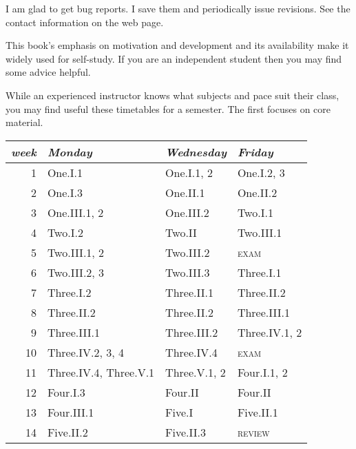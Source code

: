I am glad to get bug reports.
I save them and periodically issue revisions.
See the contact information on the web page.


\newcommand{\classday}[1]{\textsc{#1}}
\newcommand{\colwidth}{1.25in}

\medskip
{}
%
This book's emphasis on motivation and development
and its availability make it widely used for self-study.
If you are an independent student 
then you may find some advice helpful.

While an experienced instructor knows what subjects and
pace suit their class, you may find useful these
timetables for a semester.
The first focuses on core material.
\begin{center} \small
   \begin{tabular}{r|*{2}{p{\colwidth}}l}
      \textit{week}  
       &\textit{Monday}          
       &\textit{Wednesday}            
       &\textit{Friday}        \\ \hline
       1    &One.I.1         &One.I.1, 2        &One.I.2, 3         \\
       2    &One.I.3         &One.II.1          &One.II.2         \\
       3    &One.III.1, 2    &One.III.2         &Two.I.1         \\
       4    &Two.I.2         &Two.II            &Two.III.1         \\
       5    &Two.III.1, 2    &Two.III.2         &\classday{exam}          \\
       6    &Two.III.2, 3    &Two.III.3         &Three.I.1        \\
       7    &Three.I.2         &Three.II.1          &Three.II.2         \\
       8    &Three.II.2        &Three.II.2          &Three.III.1          \\
       9    &Three.III.1       &Three.III.2         &Three.IV.1, 2       \\
      10    &Three.IV.2, 3, 4  &Three.IV.4          &\classday{exam}          \\
      11    &Three.IV.4, Three.V.1 &Three.V.1, 2        &Four.I.1, 2         \\
      12    &Four.I.3         &Four.II            &Four.II       \\
      13    &Four.III.1       &Five.I             &Five.II.1         \\
      14    &Five.II.2        &Five.II.3          &\classday{review}        
   \end{tabular}
\end{center}
